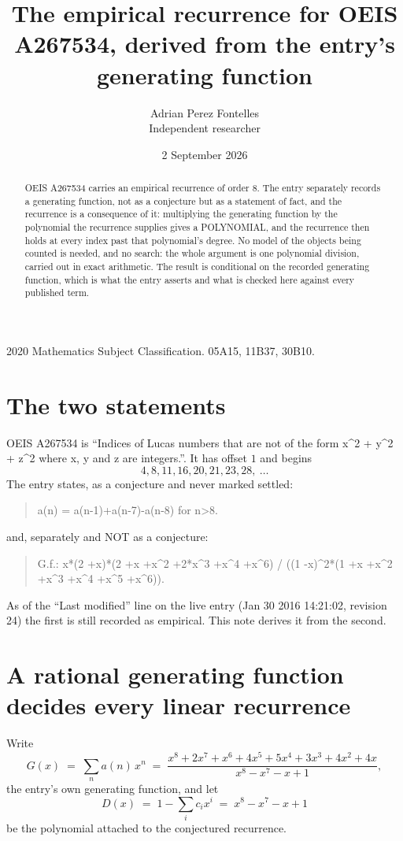 \documentclass[11pt,a4paper]{article}
\title{The empirical recurrence for OEIS A267534, derived from the entry's generating function}
\author{Adrian Perez Fontelles\\ \small Independent researcher}
\date{2 September 2026}
\theoremstyle{plain}
\theoremstyle{definition}
\begin{document}
\maketitle

\begin{abstract}
OEIS A267534 carries an empirical recurrence of order $8$. The entry separately records a
generating function, not as a conjecture but as a statement of fact, and the recurrence is a
consequence of it: multiplying the generating function by the polynomial the recurrence
supplies gives a POLYNOMIAL, and the recurrence then holds at every index past that
polynomial's degree. No model of the objects being counted is needed, and no search: the
whole argument is one polynomial division, carried out in exact arithmetic. The result is
conditional on the recorded generating function, which is what the entry asserts and what is
checked here against every published term.
\end{abstract}

\noindent\small 2020 Mathematics Subject Classification. 05A15, 11B37, 30B10.\normalsize

\section{The two statements}

OEIS A267534 is ``Indices of Lucas numbers that are not of the form x\^{}2 + y\^{}2 + z\^{}2 where x, y and z are integers.''. It has offset $1$ and begins
\[
4, 8, 11, 16, 20, 21, 23, 28,\ \dots
\]
The entry states, as a conjecture and never marked settled:
\begin{quote}
a(n) = a(n-1)+a(n-7)-a(n-8) for n>8.
\end{quote}
and, separately and NOT as a conjecture:
\begin{quote}
G.f.: x*(2 +x)*(2 +x +x\^{}2 +2*x\^{}3 +x\^{}4 +x\^{}6) / ((1 -x)\^{}2*(1 +x +x\^{}2 +x\^{}3 +x\^{}4 +x\^{}5 +x\^{}6)).
\end{quote}
As of the ``Last modified'' line on the live entry (Jan 30 2016 14:21:02, revision 24) the first is still
recorded as empirical. This note derives it from the second.

\section{A rational generating function decides every linear recurrence}

Write
\[
G(x)\;=\;\sum_{n}a(n)\,x^{n}\;=\;\frac{x^{8} + 2 x^{7} + x^{6} + 4 x^{5} + 5 x^{4} + 3 x^{3} + 4 x^{2} + 4 x}{x^{8} - x^{7} - x + 1},
\]
the entry's own generating function, and let
\[
D(x)\;=\;1-\sum_i c_i x^{i}\;=\;x^{8} - x^{7} - x + 1
\]
be the polynomial attached to the conjectured recurrence.
\end{document}
